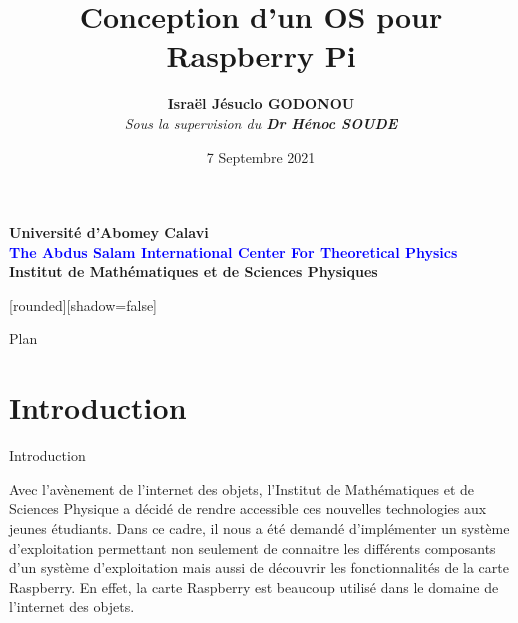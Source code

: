 \documentclass[french]{beamer}
\title{\textbf{Conception d'un OS pour Raspberry Pi}}
\subtitle{}
\author[Israël Godonou]{\textbf{Israël Jésuclo \textsc{GODONOU}}\\ \textit{\tiny Sous la supervision du \textbf{Dr Hénoc \textsc{SOUDE}} } }
\date{7 Septembre 2021}
\institute[IMSP -- Info] {\textbf{Pour l'obtention du Diplôme de Licence spéciale des classes préparatoires}\\ \textcolor{blue}{Option : \textbf{Informatique}}}
\begin{document}
\begin{frame}[plain]

\begin{center}
	\begin{figure}[!ht]		
		\centering
		\hspace{6cm}
		\label{Logos}	
	\end{figure}
	
	
	\vspace{-1cm}
	
	{\bf{ \tiny
			Université d'Abomey Calavi\\
			\textcolor{blue}{
				The Abdus Salam International Center
				For Theoretical Physics 
			}
			\\Institut de Mathématiques et de Sciences Physiques
	}}
	
	\maketitle
\end{center}
\end{frame}




[rounded][shadow=false]


\begin{frame}{Plan}	
\end{frame}

\section{Introduction}
\begin{frame}{Introduction}
	\begin{center}
		Avec l'avènement de l'internet des objets, l'Institut de Mathématiques et de Sciences Physique a décidé de rendre accessible ces nouvelles technologies aux jeunes étudiants. Dans ce cadre, il nous a été demandé d'implémenter un système d'exploitation permettant non seulement de connaitre les différents composants d'un système d'exploitation mais aussi de découvrir les fonctionnalités de la carte Raspberry. En effet, la carte Raspberry est beaucoup utilisé dans le domaine de l'internet des objets.
	\end{center}
\end{frame}
\end{document}
